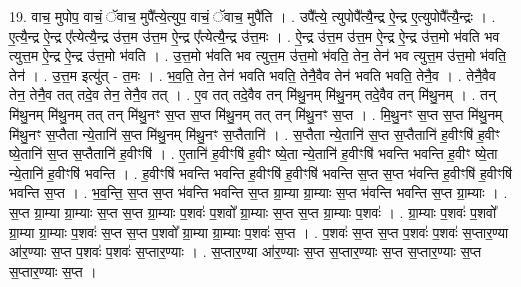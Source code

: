 \documentclass[17pt]{extarticle}
\begin{document}
19. वाच॒ मुपोप॒ वाचं॒ ॅवाच॒ मुपै᳚त्ये॒त्युप॒ वाचं॒ ॅवाच॒ मुपै॑ति । . उपै᳚त्ये॒ त्युपोपै᳚त्यै॒न्द्र ऐ॒न्द्र ए॒त्युपोपै᳚त्यै॒न्द्रः । . ए॒त्यै॒न्द्र ऐ॒न्द्र ए᳚त्येत्यै॒न्द्र उ॑त्त॒म उ॑त्त॒म ऐ॒न्द्र ए᳚त्येत्यै॒न्द्र उ॑त्त॒मः । . ऐ॒न्द्र उ॑त्त॒म उ॑त्त॒म ऐ॒न्द्र ऐ॒न्द्र उ॑त्त॒मो भ॑वति भव त्युत्त॒म ऐ॒न्द्र ऐ॒न्द्र उ॑त्त॒मो भ॑वति । . उ॒त्त॒मो भ॑वति भव त्युत्त॒म उ॑त्त॒मो भ॑वति॒ तेन॒ तेन॑ भव त्युत्त॒म उ॑त्त॒मो भ॑वति॒ तेन॑ । . उ॒त्त॒म इत्यु॑त् - त॒मः । . भ॒व॒ति॒ तेन॒ तेन॑ भवति भवति॒ तेनै॒वैव तेन॑ भवति भवति॒ तेनै॒व । . तेनै॒वैव तेन॒ तेनै॒व तत् तदे॒व तेन॒ तेनै॒व तत् । . ए॒व तत् तदे॒वैव तन् मि॑थु॒नम् मि॑थु॒नम् तदे॒वैव तन् मि॑थु॒नम् । . तन् मि॑थु॒नम् मि॑थु॒नम् तत् तन् मि॑थु॒नꣳ स॒प्त स॒प्त मि॑थु॒नम् तत् तन् मि॑थु॒नꣳ स॒प्त । . मि॒थु॒नꣳ स॒प्त स॒प्त मि॑थु॒नम् मि॑थु॒नꣳ स॒प्तैता न्ये॒तानि॑ स॒प्त मि॑थु॒नम् मि॑थु॒नꣳ स॒प्तैतानि॑ । . स॒प्तैता न्ये॒तानि॑ स॒प्त स॒प्तैतानि॑ ह॒वीꣳषि॑ ह॒वीꣳ ष्ये॒तानि॑ स॒प्त स॒प्तैतानि॑ ह॒वीꣳषि॑ । . ए॒तानि॑ ह॒वीꣳषि॑ ह॒वीꣳ ष्ये॒ता न्ये॒तानि॑ ह॒वीꣳषि॑ भवन्ति भवन्ति ह॒वीꣳ ष्ये॒ता न्ये॒तानि॑ ह॒वीꣳषि॑ भवन्ति । . ह॒वीꣳषि॑ भवन्ति भवन्ति ह॒वीꣳषि॑ ह॒वीꣳषि॑ भवन्ति स॒प्त स॒प्त भ॑वन्ति ह॒वीꣳषि॑ ह॒वीꣳषि॑ भवन्ति स॒प्त । . भ॒व॒न्ति॒ स॒प्त स॒प्त भ॑वन्ति भवन्ति स॒प्त ग्रा॒म्या ग्रा॒म्याः स॒प्त भ॑वन्ति भवन्ति स॒प्त ग्रा॒म्याः । . स॒प्त ग्रा॒म्या ग्रा॒म्याः स॒प्त स॒प्त ग्रा॒म्याः प॒शवः॑ प॒शवो᳚ ग्रा॒म्याः स॒प्त स॒प्त ग्रा॒म्याः प॒शवः॑ । . ग्रा॒म्याः प॒शवः॑ प॒शवो᳚ ग्रा॒म्या ग्रा॒म्याः प॒शवः॑ स॒प्त स॒प्त प॒शवो᳚ ग्रा॒म्या ग्रा॒म्याः प॒शवः॑ स॒प्त । . प॒शवः॑ स॒प्त स॒प्त प॒शवः॑ प॒शवः॑ स॒प्तार॒ण्या आ॑र॒ण्याः स॒प्त प॒शवः॑ प॒शवः॑ स॒प्तार॒ण्याः । . स॒प्तार॒ण्या आ॑र॒ण्याः स॒प्त स॒प्तार॒ण्याः स॒प्त स॒प्तार॒ण्याः स॒प्त स॒प्तार॒ण्याः स॒प्त । \newline
\end{document}
